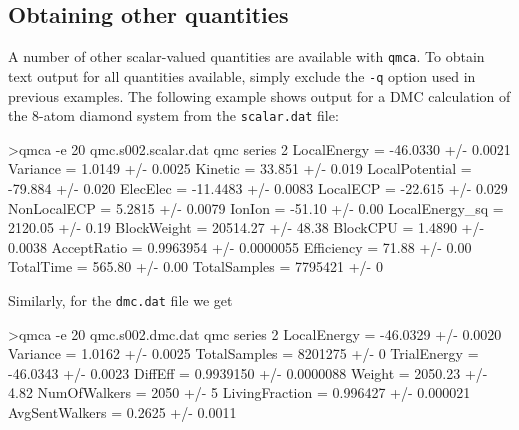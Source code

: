 \subsection{Obtaining other quantities}
\label{sec:qmca_other_quantities}
A number of other scalar-valued quantities are available with 
\texttt{qmca}.  To obtain text output for all quantities 
available, simply exclude the \texttt{-q} option used in 
previous examples.  The following example shows output for a DMC calculation 
of the 8-atom diamond system from the \texttt{scalar.dat} file:
\begin{shade}
>qmca -e 20 qmc.s002.scalar.dat 
qmc  series 2 
  LocalEnergy           =          -46.0330 +/-           0.0021 
  Variance              =            1.0149 +/-           0.0025 
  Kinetic               =            33.851 +/-            0.019 
  LocalPotential        =           -79.884 +/-            0.020 
  ElecElec              =          -11.4483 +/-           0.0083 
  LocalECP              =           -22.615 +/-            0.029 
  NonLocalECP           =            5.2815 +/-           0.0079 
  IonIon                =            -51.10 +/-             0.00 
  LocalEnergy_sq        =           2120.05 +/-             0.19 
  BlockWeight           =          20514.27 +/-            48.38 
  BlockCPU              =            1.4890 +/-           0.0038 
  AcceptRatio           =         0.9963954 +/-        0.0000055 
  Efficiency            =             71.88 +/-             0.00 
  TotalTime             =            565.80 +/-             0.00 
  TotalSamples          =           7795421 +/-                0 
\end{shade}
\noindent
Similarly, for the \texttt{dmc.dat} file we get
\begin{shade}
>qmca -e 20 qmc.s002.dmc.dat 
qmc  series 2 
  LocalEnergy           =          -46.0329 +/-           0.0020 
  Variance              =            1.0162 +/-           0.0025 
  TotalSamples          =           8201275 +/-                0 
  TrialEnergy           =          -46.0343 +/-           0.0023 
  DiffEff               =         0.9939150 +/-        0.0000088 
  Weight                =           2050.23 +/-             4.82 
  NumOfWalkers          =              2050 +/-                5 
  LivingFraction        =          0.996427 +/-         0.000021 
  AvgSentWalkers        =            0.2625 +/-           0.0011 
\end{shade}

